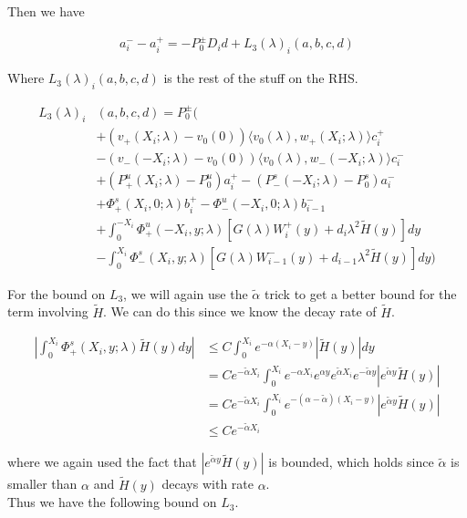 \documentclass[12pt]{article}
\begin{document}
Then we have

\begin{align*}
a_i^- - a_i^+ = -P_0^\pm D_i d + L_3(\lambda)_i(a, b, c, d)
\end{align*}

Where $L_3(\lambda)_i(a, b, c, d)$ is the rest of the stuff on the RHS.

\begin{align*}
L_3(\lambda)_i&(a, b, c, d) = P_0^\pm \Big( \\
&+(v_+(X_i; \lambda) - v_0(0)) \langle v_0(\lambda), w_+(X_i; \lambda) \rangle c_i^+ \\
&- (v_-(-X_i; \lambda) - v_0(0)) \langle v_0(\lambda), w_-(-X_i; \lambda) \rangle c_i^- \\
&+ (P^u_+(X_i; \lambda) - P_0^u)a_i^+ - (P^s_-(-X_i; \lambda) - P_0^s)a_i^- \\
&+ \Phi^s_+(X_i, 0; \lambda)b_i^+ - \Phi^u_-(-X_i, 0; \lambda)b_{i-1}^- \\
&+ \int_0^{-X_i} \Phi^u_+(-X_i, y; \lambda) [ G(\lambda)W_i^+(y) + d_i \lambda^2 \tilde{H}(y) ] dy \\
&- \int_0^{X_i} \Phi^s_-(X_i, y; \lambda) [ G(\lambda)W_{i-1}^-(y) + d_{i-1} \lambda^2 \tilde{H}(y) ] dy \Big)
\end{align*}

For the bound on $L_3$, we will again use the $\tilde{\alpha}$ trick to get a better bound for the term involving $\tilde{H}$. We can do this since we know the decay rate of $\tilde{H}$.

\begin{align*}
\left| \int_0^{X_i} \Phi^s_+(X_i, y; \lambda) \tilde{H}(y) dy \right| 
&\leq C \int_0^{X_i} e^{-\alpha (X_i - y)}|\tilde{H}(y)| dy \\
&= C e^{-\tilde{\alpha}X_i} \int_0^{X_i} e^{-\alpha X_i} e^{\alpha y}  e^{\tilde{\alpha}X_i} e^{-\tilde{\alpha}y} |e^{\tilde{\alpha}y} \tilde{H}(y)| \\
&= C e^{-\tilde{\alpha}X_i} \int_0^{X_i} e^{-(\alpha - \tilde{\alpha})(X_i-y)} |e^{\tilde{\alpha}y} \tilde{H}(y)|\\
&\leq C e^{-\tilde{\alpha}X_i} 
\end{align*}

where we again used the fact that $|e^{\tilde{\alpha}y} \tilde{H}(y)|$ is bounded, which holds since $\tilde{\alpha}$ is smaller than $\alpha$ and $\tilde{H}(y)$ decays with rate $\alpha$.\\

Thus we have the following bound on $L_3$.
\end{document}
